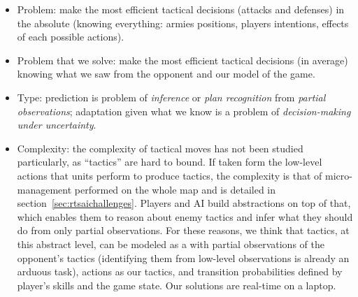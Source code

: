 \begin{itemize}
\item Problem: make the most efficient tactical decisions (attacks and defenses) in the absolute (knowing everything: armies positions, players intentions, effects of each possible actions).
\item Problem that we solve: make the most efficient tactical decisions (in average) knowing what we saw from the opponent and our model of the game. 
\item Type: prediction is problem of \textit{inference} or \textit{plan recognition} from \textit{partial observations}; adaptation given what we know is a problem of \textit{decision-making under uncertainty}. 
\item Complexity: the complexity of tactical moves has not been studied particularly, as ``tactics'' are hard to bound. If taken form the low-level actions that units perform to produce tactics, the complexity is that of micro-management performed on the whole map and is detailed in section~\ref{sec:rtsaichallenges}. Players and AI build abstractions on top of that, which enables them to reason about enemy tactics and infer what they should do from only partial observations. For these reasons, we think that tactics, at this abstract level, can be modeled as a  with partial observations of the opponent's tactics (identifying them from low-level observations is already an arduous task), actions as our tactics, and transition probabilities defined by player's skills and the game state. %
Our solutions are real-time on a laptop.
\end{itemize}

